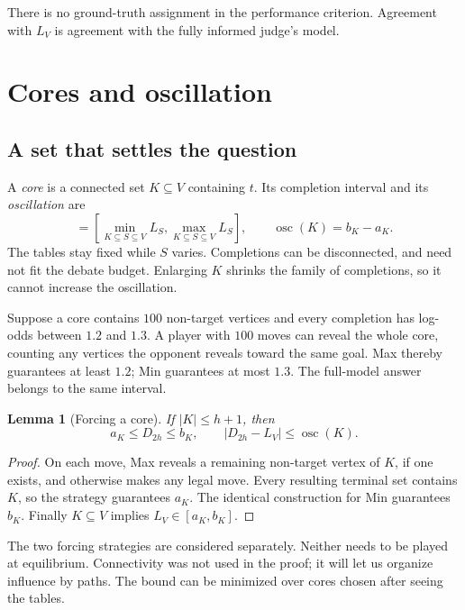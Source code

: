 \documentclass[11pt]{article}
\newtheorem{lemma}[theorem]{Lemma}
\theoremstyle{definition}
\theoremstyle{remark}
\DeclareMathOperator{\osc}{osc}
\newcommand{\err}{|D_{2h}-L_V|}
\begin{document}
There is no ground-truth assignment in the performance criterion.
Agreement with $L_V$ is agreement with the fully informed judge's model.

\clearpage
\section{Cores and oscillation}
\label{sec:cores}

\subsection{A set that settles the question}
A \emph{core} is a connected set $K\subseteq V$ containing $t$. Its
completion interval and its \emph{oscillation} are
\begin{equation}
 [a_K,b_K]=\left[\min_{K\subseteq S\subseteq V}L_S,
                     \max_{K\subseteq S\subseteq V}L_S\right],\qquad
 \osc(K)=b_K-a_K.
 \label{eq:osc}
\end{equation}
The tables stay fixed while $S$ varies. Completions can be disconnected,
and need not fit the debate budget. Enlarging $K$ shrinks the family of
completions, so it cannot increase the oscillation.

Suppose a core contains $100$ non-target vertices and every completion has
log-odds between $1.2$ and $1.3$. A player with $100$ moves can reveal the
whole core, counting any vertices the opponent reveals toward the same goal.
Max thereby guarantees at least $1.2$; Min guarantees at most $1.3$.
The full-model answer belongs to the same interval.

\begin{lemma}[Forcing a core]
\label{lem:forcing}
If $|K|\le h+1$, then
\begin{equation}
 a_K\le D_{2h}\le b_K,\qquad \err\le\osc(K).
 \label{eq:forcing}
\end{equation}
\end{lemma}
\begin{proof}
On each move, Max reveals a remaining non-target vertex of $K$, if one
exists, and otherwise makes any legal move. Every resulting terminal set
contains $K$, so the strategy guarantees $a_K$. The identical construction
for Min guarantees $b_K$. Finally $K\subseteq V$ implies $L_V\in[a_K,b_K]$.
\end{proof}

The two forcing strategies are considered separately. Neither needs to be
played at equilibrium. Connectivity was not used in the proof; it will let
us organize influence by paths. The bound can be minimized over cores
chosen after seeing the tables.
\end{document}

